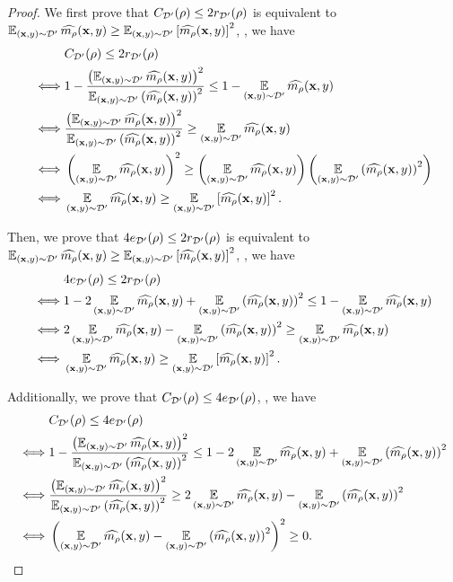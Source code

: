 \begin{noaddcontents}
\theoremrelationship*
\begin{proof}
We first prove that $\CBound_{\Dp}(\Q) \le 2r_{\Dp}(\Q)$ is equivalent to $\EE_{(\x,\y)\sim\Dp}\OmMaQ(\x,\y) \ge \EE_{(\x,\y)\sim\Dp}\LB\OmMaQ(\x,\y)\RB^2$, \ie, we have
\begin{align*}
&\CBound_{\Dp}(\Q) \le 2r_{\Dp}(\Q)\\
\iff &1-\frac{\LP\EE_{(\x,\y)\sim\Dp}\OmMaQ(\x,\y)\RP^2}{\EE_{(\x,\y)\sim\Dp}\LP \OmMaQ(\x,\y)\RP^2} \le 1-\EE_{(\x,\y)\sim\Dp}\OmMaQ(\x,\y)\\
\iff &\frac{\LP\EE_{(\x,\y)\sim\Dp}\OmMaQ(\x,\y)\RP^2}{\EE_{(\x,\y)\sim\Dp}\LP \OmMaQ(\x,\y)\RP^2} \ge \EE_{(\x,\y)\sim\Dp}\OmMaQ(\x,\y)\\
\iff &\LP\EE_{(\x,\y)\sim\Dp}\OmMaQ(\x,\y)\RP^2 \ge \LP\EE_{(\x,\y)\sim\Dp}\OmMaQ(\x,\y)\RP\LP\EE_{(\x,\y)\sim\Dp}\LP \OmMaQ(\x,\y)\RP^2\RP\\
\iff &\EE_{(\x,\y)\sim\Dp}\OmMaQ(\x,\y) \ge \EE_{(\x,\y)\sim\Dp}\LB\OmMaQ(\x,\y)\RB^2.
\end{align*}

Then, we prove that $4e_{\Dp}(\Q) \le 2r_{\Dp}(\Q)$ is equivalent to $\EE_{(\x,\y)\sim\Dp}\OmMaQ(\x,\y) \ge \EE_{(\x,\y)\sim\Dp}\LB\OmMaQ(\x,\y)\RB^2$, \ie, we have
\begin{align*}
    &4e_{\Dp}(\Q) \le 2r_{\Dp}(\Q)\\
    \iff &1- 2\EE_{(\x,\y)\sim\Dp}\OmMaQ(\x,\y) + \EE_{(\x,\y)\sim\Dp}\LP \OmMaQ(\x,\y)\RP^2 \le 1-\EE_{(\x,\y)\sim\Dp}\OmMaQ(\x,\y)\\
    \iff &2\EE_{(\x,\y)\sim\Dp}\OmMaQ(\x,\y) - \EE_{(\x,\y)\sim\Dp}\LP \OmMaQ(\x,\y)\RP^2 \ge \EE_{(\x,\y)\sim\Dp}\OmMaQ(\x,\y)\\
    \iff &\EE_{(\x,\y)\sim\Dp}\OmMaQ(\x,\y) \ge \EE_{(\x,\y)\sim\Dp}\LB\OmMaQ(\x,\y)\RB^2.
\end{align*}

Additionally, we prove that $\CBound_{\Dp}(\Q) \le 4e_{\Dp}(\Q)$, \ie, we have
\begin{align*}
&\CBound_{\Dp}(\Q) \le 4e_{\Dp}(\Q)\\
\iff &1-\frac{\LP\EE_{(\x,\y)\sim\Dp}\OmMaQ(\x,\y)\RP^2}{\EE_{(\x,\y)\sim\Dp}\LP \OmMaQ(\x,\y)\RP^2} \le 1- 2\EE_{(\x,\y)\sim\Dp}\OmMaQ(\x,\y) + \EE_{(\x,\y)\sim\Dp}\LP \OmMaQ(\x,\y)\RP^2\\
\iff &\frac{\LP\EE_{(\x,\y)\sim\Dp}\OmMaQ(\x,\y)\RP^2}{\EE_{(\x,\y)\sim\Dp}\LP \OmMaQ(\x,\y)\RP^2} \ge 2\EE_{(\x,\y)\sim\Dp}\OmMaQ(\x,\y) - \EE_{(\x,\y)\sim\Dp}\LP \OmMaQ(\x,\y)\RP^2\\
\iff &\LP\EE_{(\x,\y)\sim\Dp}\OmMaQ(\x,\y) -  \EE_{(\x,\y)\sim\Dp}\LP \OmMaQ(\x,\y)\RP^2 \RP^2 \ge 0.
\end{align*}


\end{proof}
\end{noaddcontents}
